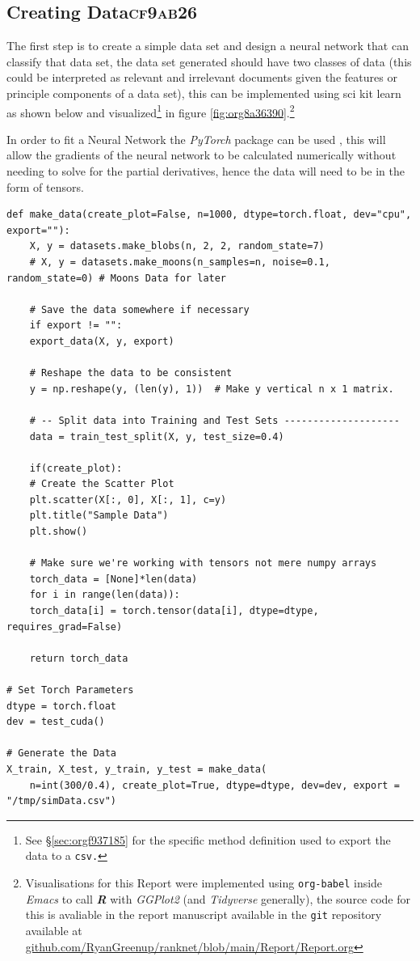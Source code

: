 \documentclass[a4paper,11pt,twoside]{article}
\begin{document}
\subsection{Creating Data\hfill{}\textsc{cf9ab26}}
\label{sec:org0fccc10}
The first step is to create a simple data set and design a neural
network that can classify that data set, the data set generated
should have two classes of data (this could be interpreted as
relevant and irrelevant documents given the features or principle
components of a data set), this can be implemented using sci kit
learn as shown below and visualized\footnote{See \S \ref{sec:orgf937185} for the specific method definition used to
export the data to a \texttt{csv.}} in figure \ref{fig:org8a36390}.\footnote{Visualisations for this Report were implemented using
\texttt{org-babel} \cite{dominikOrgModeReference2018} inside \emph{Emacs}
\cite{stallmanGNUEmacsManual2002} to call \textbf{\emph{R}}
\cite{rcoreteamLanguageEnvironmentStatistical2021} with \emph{GGPlot2}
\cite{wickhamGgplot2ElegantGraphics2016a} (and \emph{Tidyverse}
\cite{wickhamWelcomeTidyverse2019} generally), the source code for this
is avaliable in the report manuscript available in the \texttt{git} repository
available at \href{https://github.com/RyanGreenup/ranknet/blob/main/Report/Report.org}{github.com/RyanGreenup/ranknet/blob/main/Report/Report.org}\label{org1d5a249}}


In order to fit a Neural Network the \emph{PyTorch} package can be used
\cite{NEURIPS2019_9015}, this will allow the gradients of the neural
network to be calculated numerically without needing to solve for
the partial derivatives, hence the data will need to be in the
form of tensors.

\begin{verbatim}
def make_data(create_plot=False, n=1000, dtype=torch.float, dev="cpu", export=""):
    X, y = datasets.make_blobs(n, 2, 2, random_state=7)
    # X, y = datasets.make_moons(n_samples=n, noise=0.1, random_state=0) # Moons Data for later

    # Save the data somewhere if necessary
    if export != "":
	export_data(X, y, export)

    # Reshape the data to be consistent
    y = np.reshape(y, (len(y), 1))  # Make y vertical n x 1 matrix.

    # -- Split data into Training and Test Sets --------------------
    data = train_test_split(X, y, test_size=0.4)

    if(create_plot):
	# Create the Scatter Plot
	plt.scatter(X[:, 0], X[:, 1], c=y)
	plt.title("Sample Data")
	plt.show()

    # Make sure we're working with tensors not mere numpy arrays
    torch_data = [None]*len(data)
    for i in range(len(data)):
	torch_data[i] = torch.tensor(data[i], dtype=dtype, requires_grad=False)

    return torch_data

# Set Torch Parameters
dtype = torch.float
dev = test_cuda()

# Generate the Data
X_train, X_test, y_train, y_test = make_data(
    n=int(300/0.4), create_plot=True, dtype=dtype, dev=dev, export = "/tmp/simData.csv")
\end{verbatim}
\end{document}
